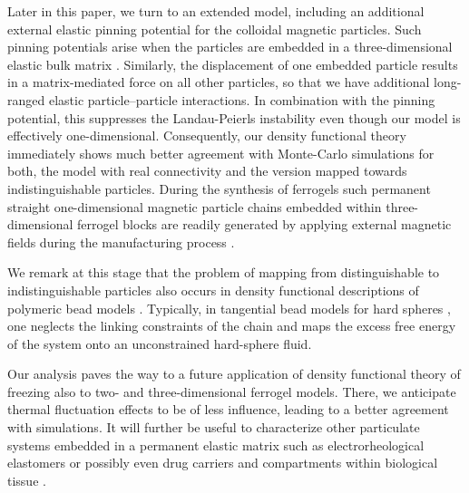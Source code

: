 \documentclass[aps,pre,twocolumn,superscriptaddress,nofootinbib]{revtex4}
\begin{document}
Later in this paper, we turn to an extended model, including an additional external elastic pinning potential for the colloidal magnetic particles. 
Such pinning potentials arise when the particles are embedded in a three-dimensional elastic bulk matrix \cite{huang2016buckling}. 
Similarly, the displacement of one embedded particle results in a matrix-mediated force on all other particles, so that we have additional long-ranged elastic particle--particle interactions.
In combination with the pinning potential, this suppresses the Landau-Peierls instability even though our model is effectively one-dimensional. 
Consequently, our density functional theory immediately shows much better agreement with Monte-Carlo simulations for both, the model with real connectivity and the version mapped towards indistinguishable particles.
During the synthesis of ferrogels such permanent straight one-dimensional magnetic particle chains embedded within three-dimensional ferrogel blocks are readily generated by applying external magnetic fields during the manufacturing process \cite{collin2003frozen,varga2003smart,gunther2012xray,borbath2012xmuct,gundermann2013comparison,huang2016buckling,Gundermann2017_SmartMaterStruct}. 

We remark at this stage that the problem of mapping from distinguishable to indistinguishable particles also occurs in density functional descriptions of polymeric bead models \cite{Chandler1986_JChemPhys_1,Chandler1986_JChemPhys_2}.
Typically, in tangential bead models for hard spheres \cite{Gu2003_JChemPhys,Slyk2016_JPhysCondensMatter}, one neglects the linking constraints of the chain and maps the excess free energy of the system onto an unconstrained hard-sphere fluid.

Our analysis paves the way to a future application of density functional theory of freezing also to two- and three-dimensional ferrogel models.
There, we anticipate thermal fluctuation effects to be of less influence, leading to a better agreement with simulations. 
It will further be useful to characterize other particulate systems embedded in a permanent elastic  matrix such as electrorheological elastomers \cite{an2003actuating,allahyarov2015simulation} or possibly even drug carriers and compartments within biological tissue \cite{tietze2013efficient}.
\end{document}
